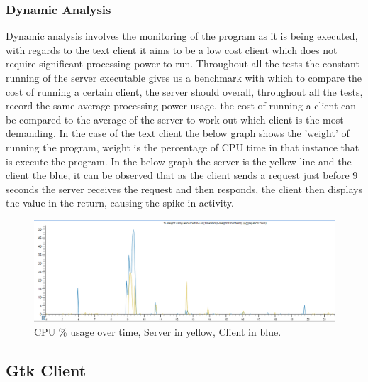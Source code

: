 \documentclass{article}
\begin{document}
\subsubsection{Dynamic Analysis}
Dynamic analysis involves the monitoring of the program as it is being executed, with regards to the text client it aims to be a low cost client which does not require significant processing power to run. Throughout all the tests the constant running of the server executable gives us a benchmark with which to compare the cost of running a certain client, the server should overall, throughout all the tests, record the same average processing power usage, the cost of running a client can be compared to the average of the server to work out which client is the most demanding. In the case of the text client the below graph shows the 'weight' of running the program, weight is the percentage of CPU time in that instance that is execute the program. In the below graph the server is the yellow line and the client the blue, it can be observed that as the client sends a request just before 9 seconds the server receives the request and then responds, the client then displays the value in the return, causing the spike in activity.  \\
\begin{figure}[H]
	\caption{CPU \% usage over time, Server in yellow, Client in blue.}
	\begin{center}
	\includegraphics[width=\textwidth]{textgraph.PNG}
	\end{center}
\end{figure}
\subsection{Gtk Client}
\end{document}
